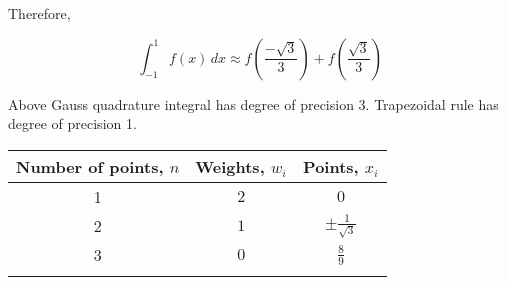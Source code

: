 \documentclass[11pt]{article}
\begin{document}
Therefore,

\[\int_{-1}^1 f(x)\,dx \approx f \left( \frac{-\sqrt 3}{3}\right)+ f \left( \frac{\sqrt 3}{3}\right)\]

Above Gauss quadrature integral has degree of precision 3. Trapezoidal
rule has degree of precision 1.

    \begin{longtable}[]{@{}ccc@{}}
\toprule
\begin{minipage}[b]{0.13\columnwidth}\centering\strut
Number of points, \(n\)\strut
\end{minipage} & \begin{minipage}[b]{0.34\columnwidth}\centering\strut
Weights, \(w_i\)\strut
\end{minipage} & \begin{minipage}[b]{0.44\columnwidth}\centering\strut
Points, \(x_i\)\strut
\end{minipage}\tabularnewline
\midrule
\endhead
\begin{minipage}[t]{0.13\columnwidth}\centering\strut
1\strut
\end{minipage} & \begin{minipage}[t]{0.34\columnwidth}\centering\strut
\(2\)\strut
\end{minipage} & \begin{minipage}[t]{0.44\columnwidth}\centering\strut
\(0\)\strut
\end{minipage}\tabularnewline
\begin{minipage}[t]{0.13\columnwidth}\centering\strut
2\strut
\end{minipage} & \begin{minipage}[t]{0.34\columnwidth}\centering\strut
\(1\)\strut
\end{minipage} & \begin{minipage}[t]{0.44\columnwidth}\centering\strut
\(\pm \frac{1}{\sqrt 3}\)\strut
\end{minipage}\tabularnewline
\begin{minipage}[t]{0.13\columnwidth}\centering\strut
3\strut
\end{minipage} & \begin{minipage}[t]{0.34\columnwidth}\centering\strut
\(0\)\strut
\end{minipage} & \begin{minipage}[t]{0.44\columnwidth}\centering\strut
\(\frac{8}{9}\)\strut
\end{minipage}\tabularnewline
\begin{minipage}[t]{0.13\columnwidth}\centering\strut

\end{minipage}
\end{longtable}
\end{document}
